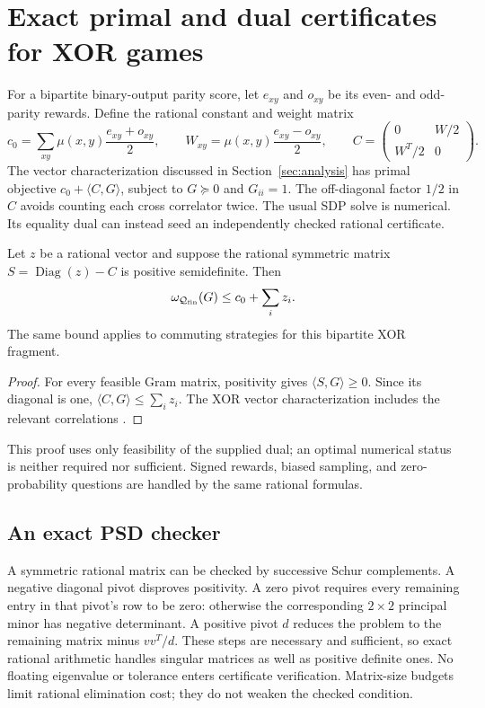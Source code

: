 \section{Exact primal and dual certificates for XOR games}
\label{sec:xorcertificates}

For a bipartite binary-output parity score, let $e_{xy}$ and $o_{xy}$ be its
even- and odd-parity rewards. Define the rational constant and weight matrix
\[
 c_0=\sum_{xy}\mu(x,y)\frac{e_{xy}+o_{xy}}2,
 \qquad W_{xy}=\mu(x,y)\frac{e_{xy}-o_{xy}}2,
 \qquad C=\begin{pmatrix}0&W/2\\W^T/2&0\end{pmatrix}.
\]
The vector characterization discussed in Section~\ref{sec:analysis} has primal
objective $c_0+\langle C,G\rangle$, subject to $G\succeq0$ and
$G_{ii}=1$. The off-diagonal factor $1/2$ in $C$ avoids counting each cross
correlator twice. The usual SDP solve is numerical. Its equality dual can
instead seed an independently checked rational certificate.

\begin{proposition}
Let $z$ be a rational vector and suppose the rational symmetric matrix
$S=\operatorname{Diag}(z)-C$ is positive semidefinite. Then
\[
 \omega_{\mathcal Q_{\rm fin}}(G)\leq c_0+\sum_i z_i.
\]
The same bound applies to commuting strategies for this bipartite XOR fragment.
\end{proposition}
\begin{proof}
For every feasible Gram matrix, positivity gives
$\langle S,G\rangle\geq0$. Since its diagonal is one,
$\langle C,G\rangle\leq\sum_i z_i$. The XOR vector characterization
includes the relevant correlations \cite{cleve2004}.
\end{proof}
This proof uses only feasibility of the supplied dual; an optimal numerical
status is neither required nor sufficient. Signed rewards, biased sampling,
and zero-probability questions are handled by the same rational formulas.

\subsection{An exact PSD checker}
A symmetric rational matrix can be checked by successive Schur complements.
A negative diagonal pivot disproves positivity. A zero pivot requires every
remaining entry in that pivot's row to be zero: otherwise the corresponding
$2\times2$ principal minor has negative determinant. A positive pivot $d$
reduces the problem to the remaining matrix minus $vv^T/d$. These steps are
necessary and sufficient, so exact rational arithmetic handles singular
matrices as well as positive definite ones. No floating eigenvalue or tolerance
enters certificate verification. Matrix-size budgets limit rational elimination
cost; they do not weaken the checked condition.

